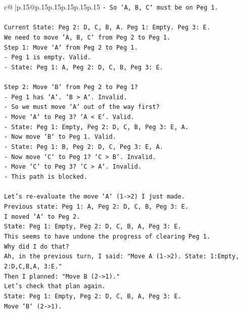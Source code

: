 \documentclass{article}
\begin{document}
{\begin{supertabular}{c@{$\;$}|p{.15\linewidth}@{}p{.15\linewidth}p{.15\linewidth}p{.15\linewidth}p{.15\linewidth}p{.15\linewidth}}
{{{\texttt{{-} So `A, B, C` must be on Peg 1.} \\
\\ 
\texttt{Current State: Peg 2: D, C, B, A. Peg 1: Empty. Peg 3: E.} \\
\texttt{We need to move `A, B, C` from Peg 2 to Peg 1.} \\
\texttt{Step 1: Move `A` from Peg 2 to Peg 1.} \\
\texttt{{-} Peg 1 is empty. Valid.} \\
\texttt{{-} State: Peg 1: A, Peg 2: D, C, B, Peg 3: E.} \\
\\ 
\texttt{Step 2: Move `B` from Peg 2 to Peg 1?} \\
\texttt{{-} Peg 1 has `A`. `B > A`. Invalid.} \\
\texttt{{-} So we must move `A` out of the way first?} \\
\texttt{{-} Move `A` to Peg 3? `A < E`. Valid.} \\
\texttt{{-} State: Peg 1: Empty, Peg 2: D, C, B, Peg 3: E, A.} \\
\texttt{{-} Now move `B` to Peg 1. Valid.} \\
\texttt{{-} State: Peg 1: B, Peg 2: D, C, Peg 3: E, A.} \\
\texttt{{-} Now move `C` to Peg 1? `C > B`. Invalid.} \\
\texttt{{-} Move `C` to Peg 3? `C > A`. Invalid.} \\
\texttt{{-} This path is blocked.} \\
\\ 
\texttt{Let's re{-}evaluate the move `A` (1{-}>2) I just made.} \\
\texttt{Previous state: Peg 1: A, Peg 2: D, C, B, Peg 3: E.} \\
\texttt{I moved `A` to Peg 2.} \\
\texttt{State: Peg 1: Empty, Peg 2: D, C, B, A, Peg 3: E.} \\
\texttt{This seems to have undone the progress of clearing Peg 1.} \\
\texttt{Why did I do that?} \\
\texttt{Ah, in the previous turn, I said: "Move A (1{-}>2). State: 1:Empty, 2:D,C,B,A, 3:E."} \\
\texttt{Then I planned: "Move B (2{-}>1)."} \\
\texttt{Let's check that plan again.} \\
\texttt{State: Peg 1: Empty, Peg 2: D, C, B, A, Peg 3: E.} \\
\texttt{Move `B` (2{-}>1).} \\
}}}
\end{supertabular}}
\end{document}
